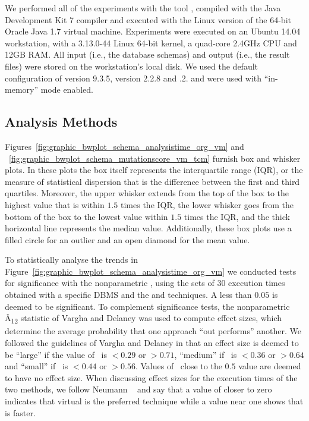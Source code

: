
We performed all of the experiments with the \SA tool \cite{Kapfhammer2013,McMinn2015,Wright2014}, compiled with the Java Development Kit 7 compiler and executed with the Linux version of the 64-bit Oracle Java 1.7 virtual machine.  Experiments were executed on an Ubuntu 14.04 workstation, with a 3.13.0-44 Linux 64-bit kernel, a quad-core 2.4GHz CPU and 12GB RAM. All input (i.e., the database schemas) and output (i.e., the result files) were stored on the workstation's local disk. We used the default configuration of \PostgreSQL version 9.3.5, \HyperSQL version 2.2.8 and .2.  \HyperSQL and \SQLite were used with ``in-memory'' mode enabled.

\subsection{Analysis Methods}
\label{sec:analysis-methods}


Figures~\ref{fig:graphic_bwplot_schema_analysistime_org_vm} and ~\ref{fig:graphic_bwplot_schema_mutationscore_vm_tcm} furnish box and whisker plots.  In these plots the box itself represents the interquartile range (IQR), or the measure of statistical dispersion that is the difference between the first and third quartiles. Moreover, the upper whisker extends from the top of the box to the highest value that is within $1.5$ times the IQR, the lower whisker goes from the bottom of the box to the lowest value within $1.5$ times the IQR, and the thick horizontal line represents the median value.  Additionally, these box plots use a filled circle for an outlier and an open diamond for the mean value.


To statistically analyse the trends in Figure~\ref{fig:graphic_bwplot_schema_analysistime_org_vm} we conducted tests for significance with the nonparametric \wilcoxon, using the sets of 30 execution times obtained with a specific DBMS and the \Original and \vma techniques.  A \pvalue less than $0.05$ is deemed to be significant.  To complement significance tests, the nonparametric \^{A}\textsubscript{12} statistic of Vargha and Delaney \cite{Vargha2000} was used to compute effect sizes, which determine the average probability that one approach ``out performs'' another.  We followed the guidelines of Vargha and Delaney in that an effect size is deemed to be ``large'' if the value of \atwelve~is $< 0.29$ or $> 0.71$, ``medium'' if \atwelve~is $< 0.36$ or $> 0.64$ and ``small'' if \atwelve~is $< 0.44$ or $> 0.56$.  Values of \atwelve~close to the $0.5$ value are deemed to have no effect size.  When discussing effect sizes for the execution times of the two methods, we follow Neumann \etal~\cite{Neumann2015} and say that a value of \atwelve closer to zero indicates that virtual is the preferred technique while a value near one shows that \Original is faster.

